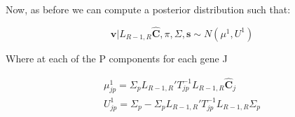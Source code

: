 \documentclass[11pt, oneside]{article}   	%
\newcommand{\chat}{\bm{\hat{C}}}
\newcommand{\vb}{\bm{v}}
\begin{document}
\begin{itemize}
Now, as before we can compute a posterior distribution such that:

\begin{equation}
\vb | L_{R-1,R}  \chat, \pi, \Sigma, \bm{s} \sim N(\mu^{1} , U^{1})
\end{equation}

Where at each of the P components for each gene J 

\begin{equation}
\begin{aligned}
\mu^{1}_{jp} = \Sigma_{p} L_{R-1,R} ' T_{jp}^{-1} L_{R-1,R}  \chat_{j} \\
U^{1}_{jp} = \Sigma_{p} - \Sigma_p L_{R-1,R} ' T_{jp}^{-1} L_{R-1,R}  \Sigma_{p}
\end{aligned}
\end{equation}


\end{itemize}
\end{document}
